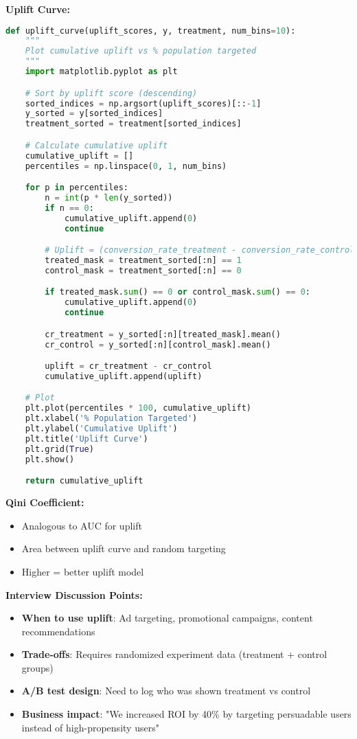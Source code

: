 \documentclass[10pt]{article}
\begin{document}
\textbf{Uplift Curve:}
\begin{lstlisting}[language=Python]
def uplift_curve(uplift_scores, y, treatment, num_bins=10):
    """
    Plot cumulative uplift vs % population targeted
    """
    import matplotlib.pyplot as plt

    # Sort by uplift score (descending)
    sorted_indices = np.argsort(uplift_scores)[::-1]
    y_sorted = y[sorted_indices]
    treatment_sorted = treatment[sorted_indices]

    # Calculate cumulative uplift
    cumulative_uplift = []
    percentiles = np.linspace(0, 1, num_bins)

    for p in percentiles:
        n = int(p * len(y_sorted))
        if n == 0:
            cumulative_uplift.append(0)
            continue

        # Uplift = (conversion_rate_treatment - conversion_rate_control)
        treated_mask = treatment_sorted[:n] == 1
        control_mask = treatment_sorted[:n] == 0

        if treated_mask.sum() == 0 or control_mask.sum() == 0:
            cumulative_uplift.append(0)
            continue

        cr_treatment = y_sorted[:n][treated_mask].mean()
        cr_control = y_sorted[:n][control_mask].mean()

        uplift = cr_treatment - cr_control
        cumulative_uplift.append(uplift)

    # Plot
    plt.plot(percentiles * 100, cumulative_uplift)
    plt.xlabel('% Population Targeted')
    plt.ylabel('Cumulative Uplift')
    plt.title('Uplift Curve')
    plt.grid(True)
    plt.show()

    return cumulative_uplift
\end{lstlisting}

\textbf{Qini Coefficient:}
\begin{itemize}
\item Analogous to AUC for uplift
\item Area between uplift curve and random targeting
\item Higher = better uplift model
\end{itemize}

\textbf{Interview Discussion Points:}
\begin{itemize}
\item \textbf{When to use uplift}: Ad targeting, promotional campaigns, content recommendations
\item \textbf{Trade-offs}: Requires randomized experiment data (treatment + control groups)
\item \textbf{A/B test design}: Need to log who was shown treatment vs control
\item \textbf{Business impact}: "We increased ROI by 40\% by targeting persuadable users instead of high-propensity users"
\end{itemize}
\end{document}
